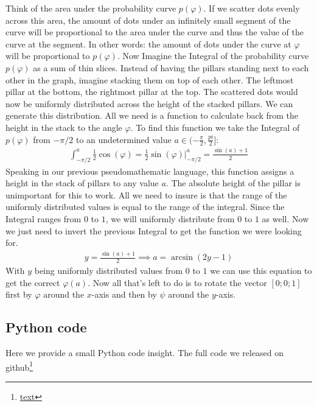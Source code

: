 \documentclass[12pt,a4paper,oneside,english]{article}
\begin{document}
Think of the area under the probability curve $p(\varphi)$. If we scatter dots evenly across this area, the amount of dots under an infinitely small segment of the curve will be proportional to the area under the curve and thus the value of the curve at the segment. In other words: the amount of dots under the curve at $\varphi$ will be proportional to $p(\varphi)$. Now Imagine the Integral of the probability curve $p(\varphi)$ as a sum of thin slices. Instead of having the pillars standing next to each other in the graph, imagine stacking them on top of each other. The leftmost pillar at the bottom, the rightmost pillar at the top. The scattered dots would now be uniformly distributed across the height of the stacked pillars. We can generate this distribution. All we need is a function to calculate back from the height in the stack to the angle $\varphi$.
To find this function we take the Integral of $p(\varphi)$ from $-\pi/2$ to an undetermined value $a \in (-\frac{\pi}{2}, \frac{pi}{2}]$:
\begin{align}
\int_{-\pi/2}^{a}\frac{1}{2}\cos(\varphi) = \frac{1}{2} \sin(\varphi) \bigg|_{-\pi/2}^{a} = \frac{\sin(a)+1}{2}
\end{align}
Speaking in our previous pseudomathematic language, this function assigns a height in the stack of pillars to any value $a$. The absolute height of the pillar is unimportant for this to work. All we need to insure is that the range of the uniformly distributed values is equal to the range of the integral. Since the Integral ranges from $0$ to $1$, we will uniformly distribute from $0$ to $1$ as well. Now we just need to invert the previous Integral to get the function we were looking for.
\begin{align}
y = \frac{\sin(a)+1}{2} \implies a=\arcsin(2y-1)
\end{align}
With $y$ being uniformly distributed values from $0$ to $1$ we can use this equation to get the correct $\varphi(a)$. Now all that’s left to do is to rotate the vector $[0;0;1]$ first by $\varphi$ around the $x$-axis and then by $\psi$ around the $y$-axis.
\subsection{Python code}
Here we provide a small Python code insight. The full code we released on github\footnote{\href{gitlink}{text}}
	\footnotesize
\end{document}
